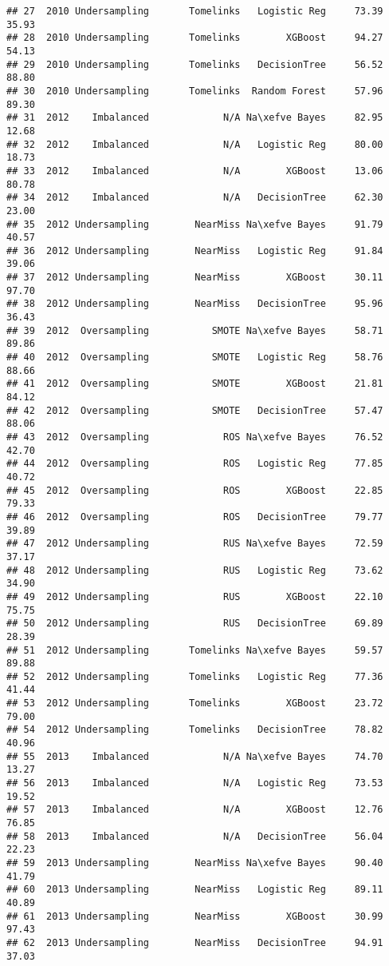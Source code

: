 \documentclass[
]{article}
\begin{document}
\begin{verbatim}
## 27  2010 Undersampling       Tomelinks   Logistic Reg     73.39  35.93
## 28  2010 Undersampling       Tomelinks        XGBoost     94.27  54.13
## 29  2010 Undersampling       Tomelinks   DecisionTree     56.52  88.80
## 30  2010 Undersampling       Tomelinks  Random Forest     57.96  89.30
## 31  2012    Imbalanced             N/A Na\xefve Bayes     82.95  12.68
## 32  2012    Imbalanced             N/A   Logistic Reg     80.00  18.73
## 33  2012    Imbalanced             N/A        XGBoost     13.06  80.78
## 34  2012    Imbalanced             N/A   DecisionTree     62.30  23.00
## 35  2012 Undersampling        NearMiss Na\xefve Bayes     91.79  40.57
## 36  2012 Undersampling        NearMiss   Logistic Reg     91.84  39.06
## 37  2012 Undersampling        NearMiss        XGBoost     30.11  97.70
## 38  2012 Undersampling        NearMiss   DecisionTree     95.96  36.43
## 39  2012  Oversampling           SMOTE Na\xefve Bayes     58.71  89.86
## 40  2012  Oversampling           SMOTE   Logistic Reg     58.76  88.66
## 41  2012  Oversampling           SMOTE        XGBoost     21.81  84.12
## 42  2012  Oversampling           SMOTE   DecisionTree     57.47  88.06
## 43  2012  Oversampling             ROS Na\xefve Bayes     76.52  42.70
## 44  2012  Oversampling             ROS   Logistic Reg     77.85  40.72
## 45  2012  Oversampling             ROS        XGBoost     22.85  79.33
## 46  2012  Oversampling             ROS   DecisionTree     79.77  39.89
## 47  2012 Undersampling             RUS Na\xefve Bayes     72.59  37.17
## 48  2012 Undersampling             RUS   Logistic Reg     73.62  34.90
## 49  2012 Undersampling             RUS        XGBoost     22.10  75.75
## 50  2012 Undersampling             RUS   DecisionTree     69.89  28.39
## 51  2012 Undersampling       Tomelinks Na\xefve Bayes     59.57  89.88
## 52  2012 Undersampling       Tomelinks   Logistic Reg     77.36  41.44
## 53  2012 Undersampling       Tomelinks        XGBoost     23.72  79.00
## 54  2012 Undersampling       Tomelinks   DecisionTree     78.82  40.96
## 55  2013    Imbalanced             N/A Na\xefve Bayes     74.70  13.27
## 56  2013    Imbalanced             N/A   Logistic Reg     73.53  19.52
## 57  2013    Imbalanced             N/A        XGBoost     12.76  76.85
## 58  2013    Imbalanced             N/A   DecisionTree     56.04  22.23
## 59  2013 Undersampling        NearMiss Na\xefve Bayes     90.40  41.79
## 60  2013 Undersampling        NearMiss   Logistic Reg     89.11  40.89
## 61  2013 Undersampling        NearMiss        XGBoost     30.99  97.43
## 62  2013 Undersampling        NearMiss   DecisionTree     94.91  37.03

\end{verbatim}
\end{document}
